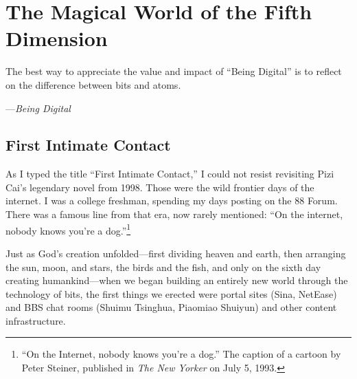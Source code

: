 
\chapter*{The Magical World of the Fifth Dimension}
{}


\begin{myquote}
The best way to appreciate the value and impact of ``Being Digital'' is to reflect on the difference between bits and atoms.

\hfill ---\textit{Being Digital}

\end{myquote}

\section{First Intimate Contact}

As I typed the title ``First Intimate Contact,'' I could not resist revisiting Pizi Cai's legendary novel from 1998. Those were the wild frontier days of the internet. I was a college freshman, spending my days posting on the 88 Forum. There was a famous line from that era, now rarely mentioned: ``On the internet, nobody knows you're a dog.''\footnote{``On the Internet, nobody knows you're a dog.'' The caption of a cartoon by Peter Steiner, published in \textit{The New Yorker} on July 5, 1993.}

Just as God's creation unfolded---first dividing heaven and earth, then arranging the sun, moon, and stars, the birds and the fish, and only on the sixth day creating humankind---when we began building an entirely new world through the technology of bits, the first things we erected were portal sites (Sina, NetEase) and BBS chat rooms (Shuimu Tsinghua, Piaomiao Shuiyun) and other content infrastructure.

